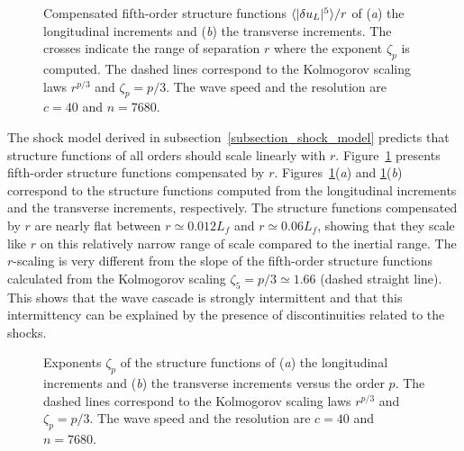 \begin{figure}
\caption{
Compensated fifth-order structure functions $\langle |\delta u_L|^5 \rangle/r$
of (\textit{a}) the longitudinal increments and (\textit{b}) the
transverse increments. %
The crosses indicate the range of separation $r$ where the exponent
$\zeta_p$ is computed. %
The dashed lines correspond to the Kolmogorov scaling laws $r^{p/3}$
and $\zeta_p = p/3$.  The wave speed and the resolution are $c = 40$
and $n = 7680$.  }
\label{fig_strfct5}
\end{figure}


The shock model derived in subsection~\ref{subsection_shock_model}
predicts that structure functions of all orders should scale linearly
with $r$.
%
Figure~\ref{fig_strfct5} presents fifth-order structure functions
compensated by $r$.
%
Figures~\ref{fig_strfct5}(\textit{a}) and
\ref{fig_strfct5}(\textit{b}) correspond to the structure functions
computed from the longitudinal increments and the transverse
increments, respectively.  The structure functions compensated by $r$
are nearly flat between $r \simeq 0.012 L_f$ and $r \simeq 0.06 L_f$,
showing that they scale like $r$ on this relatively narrow range of
scale compared to the inertial range.
%
The $r$-scaling is very different from the slope of the fifth-order
structure functions calculated from the Kolmogorov scaling $\zeta_5 =
p/3 \simeq 1.66$ (dashed straight line).  This shows that the wave
cascade is strongly intermittent and that this intermittency can be
explained by the presence of discontinuities related to the shocks.




\begin{figure}
\caption{
Exponents $\zeta_p$ of the structure functions
of (\textit{a}) the longitudinal increments
and (\textit{b}) the transverse increments versus the order $p$.
%
The dashed lines correspond to
the Kolmogorov scaling laws $r^{p/3}$ and $\zeta_p = p/3$.
The wave speed and the resolution are $c = 40$ and $n = 7680$.
}
\label{fig_interm}
\end{figure}






